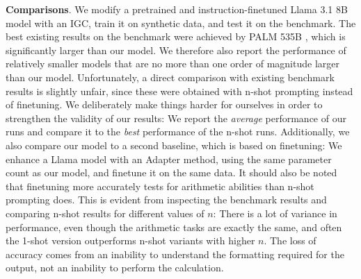 \documentclass[11pt]{article}
\begin{document}
\textbf{Comparisons}.
We modify a pretrained and instruction-finetuned Llama 3.1 8B model with an IGC, train it on synthetic data, and test it on the benchmark.
The best existing results on the benchmark were achieved by PALM 535B \citep{chowdhery2023palm}, which is significantly larger than our model. We therefore also report the performance of relatively smaller models that are no more than one order of magnitude larger than our model.
Unfortunately, a direct comparison with existing benchmark results is slightly unfair, since these were obtained with n-shot prompting instead of finetuning.
We deliberately make things harder for ourselves in order to strengthen the validity of our results: We report the \textit{average} performance of our runs and compare it to the \textit{best} performance of the n-shot runs.
Additionally, we also compare our model to a second baseline, which is based on finetuning: We enhance a Llama model with an Adapter method, using the same parameter count as our model, and finetune it on the same data.
It should also be noted that finetuning more accurately tests for arithmetic abilities than n-shot prompting does. This is evident from inspecting the benchmark results and comparing n-shot results for different values of $n$: There is a lot of variance in performance, even though the arithmetic tasks are exactly the same, and often the 1-shot version outperforms n-shot variants with higher $n$.
The loss of accuracy comes from an inability to understand the formatting required for the output, not an inability to perform the calculation.
\end{document}
